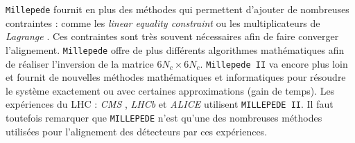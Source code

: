 % 
%    
%    
%    
% 
% 
  \medskip
  
  \texttt{Millepede} fournit en plus des m\'ethodes qui permettent d'ajouter de nombreuses contraintes : comme les \textit{linear equality constraint} ou les multiplicateurs de \textit{Lagrange} \cite{Blusk:2007zza}. Ces contraintes sont tr\`es souvent n\'ecessaires afin de faire converger l'alignement. \texttt{Millepede} offre de plus diff\'erents algorithmes math\'ematiques afin de r\'ealiser l'inversion de la matrice $6 N_c \times 6 N_c$. \texttt{Millepede II} va encore plus loin et fournit de nouvelles m\'ethodes math\'ematiques et informatiques pour r\'esoudre le syst\`eme exactement ou avec certaines approximations (gain de temps). Les exp\'eriences du LHC : \textit{CMS} \cite{Behr:2012gf} \cite{Chatrchyan:2014wfa}, \textit{LHCb} \cite{Gersabeck:2008sy} \cite{Blusk:2007zza} et \textit{ALICE} \cite{Rossi:2011gv} \cite{Aamodt:2010aa} \cite{Blusk:2007zza} utilisent \texttt{MILLEPEDE II}. Il faut toutefois remarquer que \texttt{MILLEPEDE} n'est qu'une des nombreuses m\'ethodes utilis\'ees pour l'alignement des d\'etecteurs par ces exp\'eriences.
  
